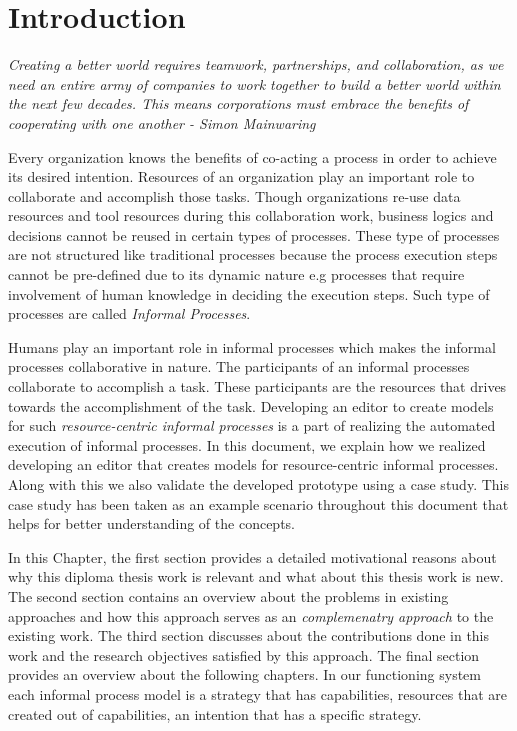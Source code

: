 \chapter{Introduction}
\label{chap:introduction}
\begin{center}
	\textit{Creating a better world requires teamwork, partnerships, and collaboration, as we need an entire army of companies to work together to build a better world within the next few decades. This means corporations must embrace the benefits of cooperating with one another -  Simon Mainwaring}
\end{center}

 Every organization knows the benefits of co-acting a process in order to achieve its desired intention. Resources of an organization play an important role to collaborate and accomplish those tasks. Though organizations re-use data resources and tool resources during this collaboration work, business logics and decisions cannot be reused in certain types of processes. These type of processes are not structured like traditional processes because the process execution steps cannot be pre-defined due to its dynamic nature e.g processes that require involvement of human knowledge in deciding the execution steps\cite{Sungur2014}. Such type of processes are called \textit{Informal Processes}.

Humans play an important role in informal processes which makes the informal processes collaborative in nature. The participants of an informal processes collaborate to accomplish a task. These participants are the resources that drives towards the accomplishment of the task.  Developing an editor to create models for such \textit{resource-centric informal processes} is a part of realizing the automated execution of informal processes. In this document, we explain how we realized developing an editor that creates models for resource-centric informal processes. Along with this we also validate the developed prototype using a case study. This case study has been taken as an example scenario throughout this document that helps for better understanding of the concepts.

In this Chapter, the first section provides a detailed motivational reasons about why this diploma thesis work is relevant and what about this thesis work is new.  The second section contains an overview about the problems in existing approaches and how this approach serves as an \textit{complemenatry approach} to the existing work. The third section discusses about the contributions done in this work  and the research objectives satisfied by this approach. The final section provides an overview about the following chapters. In our functioning system each informal process model is a strategy that has capabilities, resources that are created out of capabilities, an intention that has a specific strategy. 


